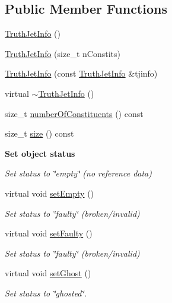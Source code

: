 \subsection*{Public Member Functions}
\begin{DoxyCompactItemize}
\item 
\hyperlink{classAnalysis_1_1FastJet_1_1TruthJetInfo_ae2ae7a6f393f32397f801364dcb4bfe9}{Truth\+Jet\+Info} ()
\item 
\hyperlink{classAnalysis_1_1FastJet_1_1TruthJetInfo_ad318a0c5d02f36a24a44222980429ae9}{Truth\+Jet\+Info} (size\+\_\+t n\+Constits)
\item 
\hyperlink{classAnalysis_1_1FastJet_1_1TruthJetInfo_ae60ed5e1e6731924f3c2b30c3e9095aa}{Truth\+Jet\+Info} (const \hyperlink{classAnalysis_1_1FastJet_1_1TruthJetInfo}{Truth\+Jet\+Info} \&tjinfo)
\item 
virtual \hyperlink{classAnalysis_1_1FastJet_1_1TruthJetInfo_aaa34d97cea3e30c8c7bbc3ecdefefff1}{$\sim$\+Truth\+Jet\+Info} ()
\item 
size\+\_\+t \hyperlink{classAnalysis_1_1FastJet_1_1TruthJetInfo_a5fda799429f1c85925af4e03adaa6c09}{number\+Of\+Constituents} () const 
\item 
size\+\_\+t \hyperlink{classAnalysis_1_1FastJet_1_1TruthJetInfo_aec74be978cd1617442494c545a1cb4cb}{size} () const 
\end{DoxyCompactItemize}
\begin{Indent}{\bf Set object status}\par
{\em Set status to \char`\"{}empty\char`\"{} (no reference data) }\begin{DoxyCompactItemize}
\item 
virtual void \hyperlink{classAnalysis_1_1FastJet_1_1UserInfo_ab87ca9e42c15c24c8f54bad4b9674d0c}{set\+Empty} ()
\begin{DoxyCompactList}\small\item\em Set status to \char`\"{}faulty\char`\"{} (broken/invalid) \end{DoxyCompactList}\item 
virtual void \hyperlink{classAnalysis_1_1FastJet_1_1UserInfo_a0c5efdcfb658e75538dd5ec29c27afe0}{set\+Faulty} ()
\begin{DoxyCompactList}\small\item\em Set status to \char`\"{}faulty\char`\"{} (broken/invalid) \end{DoxyCompactList}\item 
virtual void \hyperlink{classAnalysis_1_1FastJet_1_1UserInfo_ab22ff88713e1ad12bd2311cc4f1c998c}{set\+Ghost} ()
\begin{DoxyCompactList}\small\item\em Set status to \char`\"{}ghosted\char`\"{}. \end{DoxyCompactList}\end{DoxyCompactItemize}
\end{Indent}
